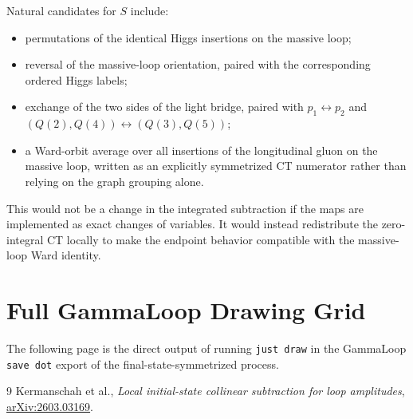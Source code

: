 \documentclass[11pt]{report}
\begin{document}
Natural candidates for \(S\) include:
\begin{itemize}
  \item permutations of the identical Higgs insertions on the massive loop;
  \item reversal of the massive-loop orientation, paired with the corresponding
  ordered Higgs labels;
  \item exchange of the two sides of the light bridge, paired with
  \(p_1\leftrightarrow p_2\) and
  \((Q(2),Q(4))\leftrightarrow(Q(3),Q(5))\);
  \item a Ward-orbit average over all insertions of the longitudinal gluon on
  the massive loop, written as an explicitly symmetrized CT numerator rather
  than relying on the graph grouping alone.
\end{itemize}

This would not be a change in the integrated subtraction if the maps are
implemented as exact changes of variables. It would instead redistribute the
zero-integral CT locally to make the endpoint behavior compatible with the
massive-loop Ward identity.

\appendix

\chapter{Full GammaLoop Drawing Grid}
\label{app:drawings}

The following page is the direct output of running \texttt{just draw} in the
GammaLoop \texttt{save dot} export of the final-state-symmetrized process.



\begin{thebibliography}{9}
Kermanschah et al.,
\emph{Local initial-state collinear subtraction for loop amplitudes},
\href{https://arxiv.org/abs/2603.03169}{arXiv:2603.03169}.
\end{thebibliography}
\end{document}
